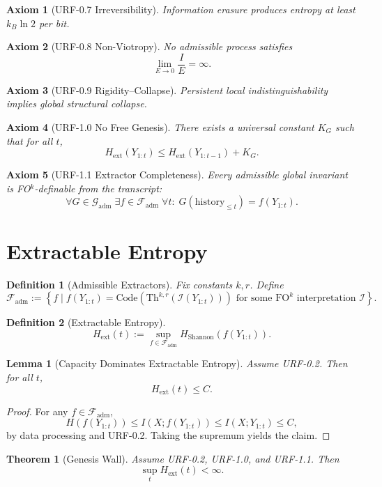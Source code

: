 \documentclass[11pt]{article}
\newtheorem{theorem}{Theorem}
\newtheorem{lemma}{Lemma}
\newtheorem{definition}{Definition}
\newtheorem{axiom}{Axiom}
\begin{document}
\begin{axiom}[URF-0.7 Irreversibility]
Information erasure produces entropy at least $k_B \ln 2$ per bit.
\end{axiom}

\begin{axiom}[URF-0.8 Non-Viotropy]
No admissible process satisfies
\[
\lim_{E\to 0} \frac{I}{E} = \infty.
\]
\end{axiom}

\begin{axiom}[URF-0.9 Rigidity--Collapse]
Persistent local indistinguishability implies global structural collapse.
\end{axiom}

\begin{axiom}[URF-1.0 No Free Genesis]
There exists a universal constant $K_G$ such that for all $t$,
\[
H_{\mathrm{ext}}(Y_{1:t}) \le H_{\mathrm{ext}}(Y_{1:t-1}) + K_G.
\]
\end{axiom}

\begin{axiom}[URF-1.1 Extractor Completeness]
Every admissible global invariant is FO$^k$-definable from the transcript:
\[
\forall G\in\mathcal G_{\mathrm{adm}}\;
\exists f\in\mathcal F_{\mathrm{adm}}\;
\forall t:\;
G(\mathrm{history}_{\le t}) = f(Y_{1:t}).
\]
\end{axiom}

\section*{Extractable Entropy}

\begin{definition}[Admissible Extractors]
Fix constants $k,r$. Define
\[
\mathcal F_{\mathrm{adm}}
:=
\left\{
f \mid
f(Y_{1:t}) =
\mathrm{Code}\!\left(
\mathrm{Th}^{k,r}(\mathcal I(Y_{1:t}))
\right)
\text{ for some FO}^k \text{ interpretation } \mathcal I
\right\}.
\]
\end{definition}

\begin{definition}[Extractable Entropy]
\[
H_{\mathrm{ext}}(t)
:=
\sup_{f\in\mathcal F_{\mathrm{adm}}}
H_{\mathrm{Shannon}}(f(Y_{1:t})).
\]
\end{definition}

\begin{lemma}[Capacity Dominates Extractable Entropy]
Assume URF-0.2. Then for all $t$,
\[
H_{\mathrm{ext}}(t) \le C.
\]
\end{lemma}

\begin{proof}
For any $f\in\mathcal F_{\mathrm{adm}}$,
\[
H(f(Y_{1:t}))
\le I(X;f(Y_{1:t}))
\le I(X;Y_{1:t})
\le C,
\]
by data processing and URF-0.2. Taking the supremum yields the claim.
\end{proof}

\begin{theorem}[Genesis Wall]
Assume URF-0.2, URF-1.0, and URF-1.1. Then
\[
\sup_t H_{\mathrm{ext}}(t) < \infty.
\]
\end{theorem}
\end{document}
